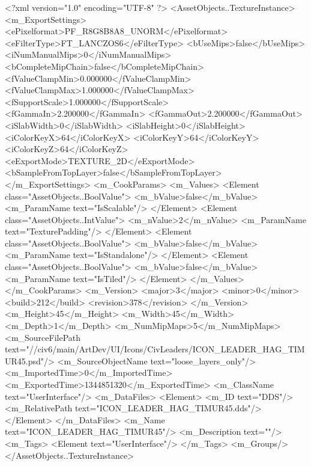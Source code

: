 <?xml version="1.0" encoding="UTF-8" ?>
<AssetObjects..TextureInstance>
	<m_ExportSettings>
		<ePixelformat>PF_R8G8B8A8_UNORM</ePixelformat>
		<eFilterType>FT_LANCZOS6</eFilterType>
		<bUseMips>false</bUseMips>
		<iNumManualMips>0</iNumManualMips>
		<bCompleteMipChain>false</bCompleteMipChain>
		<fValueClampMin>0.000000</fValueClampMin>
		<fValueClampMax>1.000000</fValueClampMax>
		<fSupportScale>1.000000</fSupportScale>
		<fGammaIn>2.200000</fGammaIn>
		<fGammaOut>2.200000</fGammaOut>
		<iSlabWidth>0</iSlabWidth>
		<iSlabHeight>0</iSlabHeight>
		<iColorKeyX>64</iColorKeyX>
		<iColorKeyY>64</iColorKeyY>
		<iColorKeyZ>64</iColorKeyZ>
		<eExportMode>TEXTURE_2D</eExportMode>
		<bSampleFromTopLayer>false</bSampleFromTopLayer>
	</m_ExportSettings>
	<m_CookParams>
		<m_Values>
			<Element class="AssetObjects..BoolValue">
				<m_bValue>false</m_bValue>
				<m_ParamName text="IsScalable"/>
			</Element>
			<Element class="AssetObjects..IntValue">
				<m_nValue>2</m_nValue>
				<m_ParamName text="TexturePadding"/>
			</Element>
			<Element class="AssetObjects..BoolValue">
				<m_bValue>false</m_bValue>
				<m_ParamName text="IsStandalone"/>
			</Element>
			<Element class="AssetObjects..BoolValue">
				<m_bValue>false</m_bValue>
				<m_ParamName text="IsTiled"/>
			</Element>
		</m_Values>
	</m_CookParams>
	<m_Version>
		<major>3</major>
		<minor>0</minor>
		<build>212</build>
		<revision>378</revision>
	</m_Version>
	<m_Height>45</m_Height>
	<m_Width>45</m_Width>
	<m_Depth>1</m_Depth>
	<m_NumMipMaps>5</m_NumMipMaps>
	<m_SourceFilePath text="//civ6/main/ArtDev/UI/Icons/CivLeaders/ICON_LEADER_HAG_TIMUR45.psd"/>
	<m_SourceObjectName text="loose_layers_only"/>
	<m_ImportedTime>0</m_ImportedTime>
	<m_ExportedTime>1344851320</m_ExportedTime>
	<m_ClassName text="UserInterface"/>
	<m_DataFiles>
		<Element>
			<m_ID text="DDS"/>
			<m_RelativePath text="ICON_LEADER_HAG_TIMUR45.dds"/>
		</Element>
	</m_DataFiles>
	<m_Name text="ICON_LEADER_HAG_TIMUR45"/>
	<m_Description text=""/>
	<m_Tags>
		<Element text="UserInterface"/>
	</m_Tags>
	<m_Groups/>
</AssetObjects..TextureInstance>

